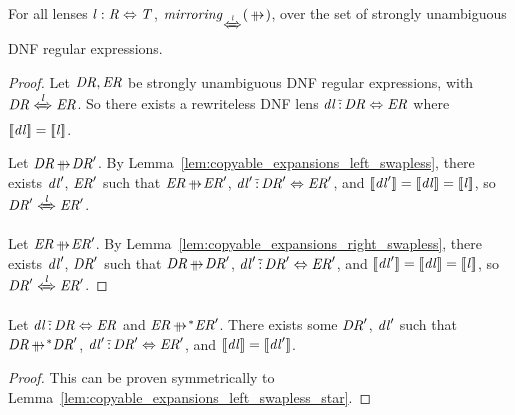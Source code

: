 \documentclass[numbers,10pt,preprint\ifanon ,nocopyrightspace\fi]{sigplanconf}
\begin{document}
\begin{lemma}
  \label{lem:mirroring-property-parallel-swapless}
  For all lenses $\mathit{l} : \mathit{R} \Leftrightarrow \mathit{T}$,
  $\IsMirroringWithPropertyOf{\ParallelRewrite}{\DNFLensHasSemanticsOf{\Lens}}$,
  over the set of strongly unambiguous DNF regular expressions.
\end{lemma}
\begin{proof}
  Let $\mathit{DR},\mathit{ER}$ be strongly unambiguous DNF regular expressions,
  with $\DNFRegex \DNFLensHasSemanticsOf{\Lens} \DNFRegexAlt$.
  So there exists a rewriteless DNF lens
  $\mathit{dl} \,\tilde{:}\, \mathit{DR} \Leftrightarrow \mathit{ER}$ where
  $[ \! [\mathit{dl}] \! ] = [ \! [\mathit{l}] \! ]$.

  Let $\DNFRegex \ParallelRewrite \DNFRegex'$.  By
  Lemma~\ref{lem:copyable_expansions_left_swapless}, there exists $\mathit{dl}'$,
  $\mathit{ER}'$ such that $\DNFRegexAlt \ParallelRewrite \DNFRegexAlt'$,
  $\mathit{dl}' \,\tilde{:}\, \mathit{DR}' \Leftrightarrow \mathit{ER}'$,
  and $[ \! [\mathit{dl}'] \! ] = [ \! [\mathit{dl}] \! ] = [ \! [\mathit{l}] \! ]$,
  so $\DNFRegex' \DNFLensHasSemanticsOf{\Lens} \DNFRegexAlt'$.

  Let $\DNFRegexAlt \ParallelRewrite \DNFRegexAlt'$.  By
  Lemma~\ref{lem:copyable_expansions_right_swapless}, there exists $\mathit{dl}'$,
  $\mathit{DR}'$ such that $\DNFRegex \ParallelRewrite \DNFRegex'$,
  $\mathit{dl}' \,\tilde{:}\, \mathit{DR}' \Leftrightarrow \mathit{ER}'$,
  and $[ \! [\mathit{dl}'] \! ] = [ \! [\mathit{dl}] \! ] = [ \! [\mathit{l}] \! ]$,
  so $\DNFRegex' \DNFLensHasSemanticsOf{\Lens} \DNFRegexAlt'$.
\end{proof}

\begin{lemma}
  \label{lem:copyable_expansions_right_swapless_star}
  Let $\mathit{dl} \,\tilde{:}\, \mathit{DR} \Leftrightarrow
  \mathit{ER}$ and $\DNFRegexAlt \StarOf{\ParallelRewrite} \DNFRegexAlt'$.
  There exists some
  $\mathit{DR}'$, $\mathit{dl}'$ such that $\DNFRegex
  \StarOf{\ParallelRewrite} \DNFRegex'$,
  $\mathit{dl}' \,\tilde{:}\,
  \mathit{DR}' \Leftrightarrow \mathit{ER}'$, and $[ \! [\mathit{dl}] \! ] =
  [ \! [\mathit{dl}'] \! ]$.
\end{lemma}
\begin{proof}
  This can be proven symmetrically to
  Lemma~\ref{lem:copyable_expansions_left_swapless_star}.
\end{proof}
\end{document}
